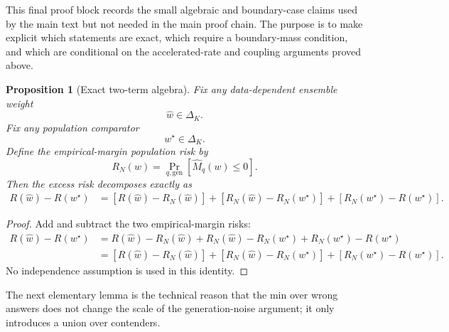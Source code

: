 \documentclass{article} %
\newtheorem{proposition}[theorem]{Proposition}
\providecommand{\simplex}{\Delta_K}
\providecommand{\Risk}{R}
\providecommand{\Mhat}{\widehat{M}}
\providecommand{\what}{\widehat{w}}
\providecommand{\wstar}{w^{\star}}
\begin{document}
This final proof block records the small algebraic and boundary-case claims used by the main text but not needed in the main proof chain.  The purpose is to make explicit which statements are exact, which require a boundary-mass condition, and which are conditional on the accelerated-rate and coupling arguments proved above.

\begin{proposition}[Exact two-term algebra]
\label{prop:4}
Fix any data-dependent ensemble weight
\begin{equation}
\label{eq:app4-what}
\what \in \simplex .
\end{equation}
Fix any population comparator
\begin{equation}
\label{eq:app4-wstar}
\wstar \in \simplex .
\end{equation}
Define the empirical-margin population risk by
\begin{equation}
\label{eq:app4-rn}
R_N(w)
=
\Pr_{q,\mathrm{gen}}\!\left[\Mhat_q(w)\le 0\right].
\end{equation}
Then the excess risk decomposes exactly as
\begin{align}
\Risk(\what)-\Risk(\wstar)
&=
\left[\Risk(\what)-R_N(\what)\right]
+
\left[R_N(\what)-R_N(\wstar)\right]
+
\left[R_N(\wstar)-\Risk(\wstar)\right].
\label{eq:app4-decomp-restated}
\end{align}
\end{proposition}

\begin{proof}
Add and subtract the two empirical-margin risks:
\begin{align}
\Risk(\what)-\Risk(\wstar)
&=
\Risk(\what)
-
R_N(\what)
+
R_N(\what)
-
R_N(\wstar)
+
R_N(\wstar)
-
\Risk(\wstar)
\label{eq:app4-decomp-proof-a}
\\
&=
\left[\Risk(\what)-R_N(\what)\right]
+
\left[R_N(\what)-R_N(\wstar)\right]
+
\left[R_N(\wstar)-\Risk(\wstar)\right].
\label{eq:app4-decomp-proof-b}
\end{align}
No independence assumption is used in this identity.
\end{proof}

The next elementary lemma is the technical reason that the min over wrong answers does not change the scale of the generation-noise argument; it only introduces a union over contenders.
\end{document}
